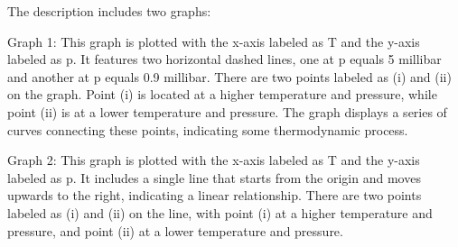 The description includes two graphs:

Graph 1: This graph is plotted with the x-axis labeled as T and the y-axis labeled as p. It features two horizontal dashed lines, one at p equals 5 millibar and another at p equals 0.9 millibar. There are two points labeled as (i) and (ii) on the graph. Point (i) is located at a higher temperature and pressure, while point (ii) is at a lower temperature and pressure. The graph displays a series of curves connecting these points, indicating some thermodynamic process.

Graph 2: This graph is plotted with the x-axis labeled as T and the y-axis labeled as p. It includes a single line that starts from the origin and moves upwards to the right, indicating a linear relationship. There are two points labeled as (i) and (ii) on the line, with point (i) at a higher temperature and pressure, and point (ii) at a lower temperature and pressure.